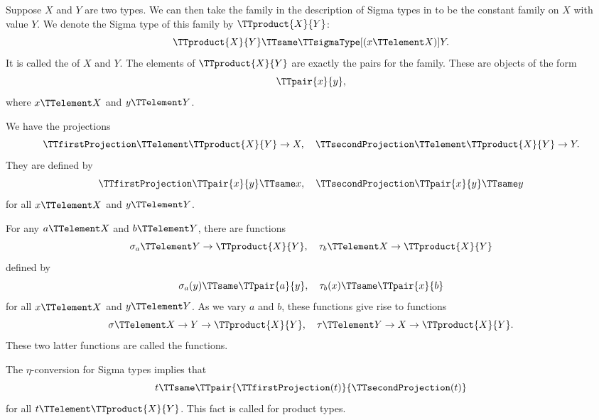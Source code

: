 \documentclass{article}
\begin{document}
Suppose $X$ and $Y$ are two types.  We can then take the family in the
description of Sigma types in  to be the
constant family on $X$ with value $Y$.  We denote the Sigma type of
this family by $\TTproduct{X}{Y}$:
\begin{equation*}
  \TTproduct{X}{Y} \TTsame \TTsigmaType[(x \TTelement X)] Y.
\end{equation*}
It is called the  of $X$ and $Y$.  The elements
of $\TTproduct{X}{Y}$ are exactly the pairs for the family.  These are
objects of the form
\begin{equation*}
  \TTpair{x}{y},
\end{equation*}
where $x \TTelement X$ and $y \TTelement Y$.

We have the projections
\begin{equation*}
  \TTfirstProjection \TTelement \TTproduct{X}{Y} \to X, \quad
  \TTsecondProjection \TTelement \TTproduct{X}{Y} \to Y.
\end{equation*}
They are defined by
\begin{equation*}
  \TTfirstProjection \TTpair{x}{y} \TTsame x, \quad
  \TTsecondProjection \TTpair{x}{y} \TTsame y
\end{equation*}
for all $x \TTelement X$ and $y \TTelement Y$.

For any $a \TTelement X$ and $b \TTelement Y$, there are functions
\begin{equation*}
  \sigma_a \TTelement Y \to \TTproduct{X}{Y}, \quad
  \tau_b \TTelement X \to \TTproduct{X}{Y}
\end{equation*}
defined by
\begin{equation*}
  \sigma_a(y) \TTsame \TTpair{a}{y}, \quad
  \tau_b(x) \TTsame \TTpair{x}{b}
\end{equation*}
for all $x \TTelement X$ and $y \TTelement Y$.  As we vary $a$ and
$b$, these functions give rise to functions
\begin{equation*}
  \sigma \TTelement X \to Y \to \TTproduct{X}{Y},
  \quad
  \tau \TTelement Y \to X \to \TTproduct{X}{Y}.
\end{equation*}
These two latter functions are called the 
functions.

The $\eta$-conversion for Sigma types implies that
\begin{equation*}
  t \TTsame \TTpair{\TTfirstProjection(t)}{\TTsecondProjection(t)}
\end{equation*}
for all $t \TTelement \TTproduct{X}{Y}$.  This fact is called
 for product types.
\end{document}
